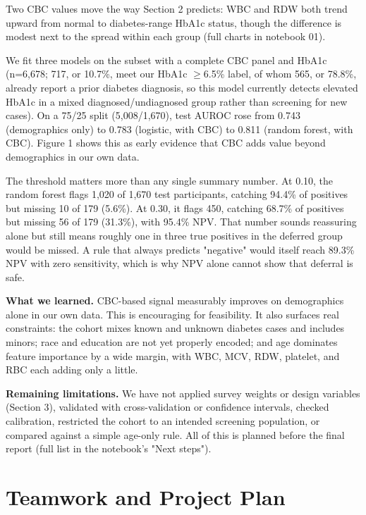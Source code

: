 \documentclass[conference]{IEEEtran}
\begin{document}
Two CBC values move the way Section 2 predicts: WBC and RDW both trend upward from normal to diabetes-range HbA1c status, though the difference is modest next to the spread within each group (full charts in notebook 01).


We fit three models on the subset with a complete CBC panel and HbA1c (n=6,678; 717, or 10.7\%, meet our HbA1c \(\geq\)6.5\% label, of whom 565, or 78.8\%, already report a prior diabetes diagnosis, so this model currently detects elevated HbA1c in a mixed diagnosed/undiagnosed group rather than screening for new cases). On a 75/25 split (5,008/1,670), test AUROC rose from 0.743 (demographics only) to 0.783 (logistic, with CBC) to 0.811 (random forest, with CBC). Figure 1 shows this as early evidence that CBC adds value beyond demographics in our own data.



The threshold matters more than any single summary number. At 0.10, the random forest flags 1,020 of 1,670 test participants, catching 94.4\% of positives but missing 10 of 179 (5.6\%). At 0.30, it flags 450, catching 68.7\% of positives but missing 56 of 179 (31.3\%), with 95.4\% NPV. That number sounds reassuring alone but still means roughly one in three true positives in the deferred group would be missed. A rule that always predicts "negative" would itself reach 89.3\% NPV with zero sensitivity, which is why NPV alone cannot show that deferral is safe.


\noindent\textbf{What we learned.} CBC-based signal measurably improves on demographics alone in our own data. This is encouraging for feasibility. It also surfaces real constraints: the cohort mixes known and unknown diabetes cases and includes minors; race and education are not yet properly encoded; and age dominates feature importance by a wide margin, with WBC, MCV, RDW, platelet, and RBC each adding only a little.


\noindent\textbf{Remaining limitations.} We have not applied survey weights or design variables (Section 3), validated with cross-validation or confidence intervals, checked calibration, restricted the cohort to an intended screening population, or compared against a simple age-only rule. All of this is planned before the final report (full list in the notebook's "Next steps").


\section{Teamwork and Project Plan }
\end{document}
